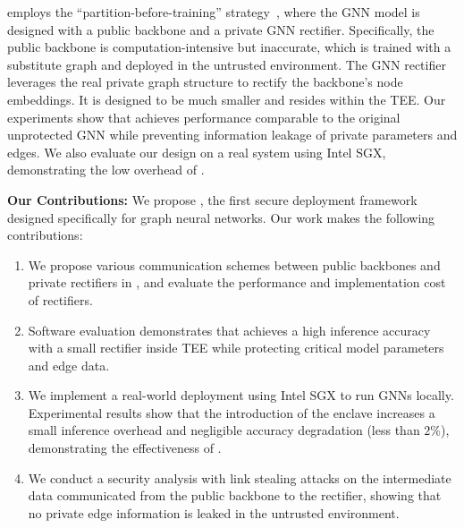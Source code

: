 \mymethod employs the ``partition-before-training'' strategy~\cite{zhang2024no}, where the GNN model is designed with a public backbone and a private GNN rectifier. Specifically, the public backbone is computation-intensive but inaccurate, which is trained with a substitute graph and deployed in the untrusted environment. 
The GNN rectifier leverages the real private graph structure to rectify the backbone's node embeddings. It is designed to be much smaller and resides within the TEE. 
Our experiments show that \mymethod achieves performance comparable to the original unprotected GNN while preventing information leakage of private parameters and edges. 
We also evaluate our design on a real system using Intel SGX, demonstrating the low overhead of \mymethod. 

\textbf{Our Contributions:} We propose \mymethod, the first secure deployment framework designed specifically for graph neural networks. Our work makes the following contributions:

\begin{enumerate}[leftmargin=*]
\item We propose various communication schemes between public backbones and private rectifiers in \mymethod, and evaluate the performance and implementation cost of rectifiers.
\item Software evaluation demonstrates that \mymethod achieves a high inference accuracy with a small rectifier inside TEE while protecting critical model parameters and edge data. 
\item We implement a real-world deployment using Intel SGX to run GNNs locally. Experimental results show that the introduction of the enclave increases a small inference overhead and negligible accuracy degradation (less than $2\%$), demonstrating the effectiveness of \mymethod. 
\item We conduct a security analysis with link stealing attacks on the intermediate data communicated from the public backbone to the rectifier, showing that no private edge information is leaked in the untrusted environment.

\end{enumerate}
